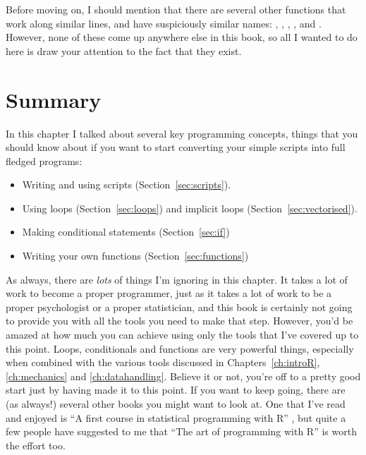 Before moving on, I should mention that there are several other functions that work along similar lines, and have suspiciously similar names: , , , ,  and . However, none of these come up anywhere else in this book, so all I wanted to do here is draw your attention to the fact that they exist.






\section{Summary}

In this chapter I talked about several key programming concepts, things that you should know about if you want to start converting your simple scripts into full fledged programs:

\begin{itemize}
\item Writing and using scripts (Section~\ref{sec:scripts}).
\item Using loops (Section~\ref{sec:loops}) and implicit loops (Section~\ref{sec:vectorised}).
\item Making conditional statements (Section~\ref{sec:if})
\item Writing your own functions (Section~\ref{sec:functions})
\end{itemize}

\noindent
As always, there are {\it lots} of things I'm ignoring in this chapter. It takes a lot of work to become a proper programmer, just as it takes a lot of work to be a proper psychologist or a proper statistician, and this book is certainly not going to provide you with all the tools you need to make that step. However, you'd be amazed at how much you can achieve using only the tools that I've covered up to this point. Loops, conditionals and functions are very powerful things, especially when combined with the various tools discussed in Chapters~\ref{ch:introR}, \ref{ch:mechanics} and \ref{ch:datahandling}. Believe it or not, you're off to a pretty good start just by having made it to this point. If you want to keep going, there are (as always!) several other books you might want to look at. One that I've read and enjoyed is  ``A first course in statistical programming with R'' \cite{Braun2007}, but quite a few people have suggested to me that ``The art of programming with R'' \cite{Matloff2011} is worth the effort too. 



